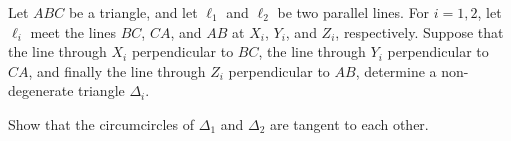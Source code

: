 Let $ABC$ be a triangle, and let $\ell_1$ and $\ell_2$ be two parallel lines. For $i = 1, 2$, let $\ell_i$ meet the lines $BC$, $CA$, and $AB$ at $X_i$, $Y_i$, and $Z_i$, respectively. Suppose that the line through $X_i$ perpendicular to $BC$, the line through $Y_i$ perpendicular to $CA$, and finally the line through $Z_i$ perpendicular to $AB$, determine a non-degenerate triangle $\Delta_i$.

Show that the circumcircles of $\Delta_1$ and $\Delta_2$ are tangent to each other.

